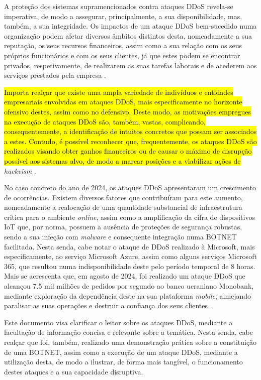 A proteção dos sistemas supramencionados contra ataques DDoS revela-se imperativa, de modo a assegurar, principalmente, a sua disponibilidade, mas, também, a sua integridade. Os impactos de um ataque DDoS bem-sucedido numa organização podem afetar diversos âmbitos distintos desta, nomeadamente a sua reputação, os seus recursos financeiros, assim como a sua relação com os seus próprios funcionários e com os seus clientes, já que estes podem se encontrar privados, respetivamente, de realizarem as suas tarefas laborais e de acederem aos serviços prestados pela empresa \cite{kaspersky_how_ddos_works}.


\hl{Importa realçar que existe uma ampla variedade de indivíduos e entidades empresariais envolvidas em ataques DDoS, mais especificamente no horizonte ofensivo destes, assim como no defensivo. Deste modo, as motivações empregues na execução de ataques DDoS são, também, vastas, complicando, consequentemente, a identificação de intuitos concretos que possam ser associados a estes. Contudo, é possível reconhecer que, frequentemente, os ataques DDoS são realizados visando obter ganhos financeiros ou de causar o máximo de disrupção possível aos sistemas alvo, de modo a marcar posições e a viabilizar ações de} \textit{hackvism} \cite{fortinet_what_is_ddos}.

No caso concreto do ano de 2024, os ataques DDoS apresentaram um crescimento de ocorrências. Existem diversos fatores que contribuíram para este aumento, nomeadamente a realocação de uma quantidade substancial de infraestrutura critica para o ambiente \textit{online}, assim como a amplificação da cifra de dispositivos IoT que, por norma, possuem a ausência de proteções de segurança robustas, sendo a sua infeção com \textit{malware} e consequente integração numa BOTNET facilitada. Nesta senda, cabe notar o ataque de DDoS realizado à Microsoft, mais especificamente, ao serviço Microsoft Azure, assim como alguns serviços Microsoft 365, que resultou numa indisponibilidade deste pelo período temporal de 8 horas. Mais se acrescenta que, em agosto de 2024, foi realizado um ataque DDoS que alcançou 7.5 mil milhões de pedidos por segundo ao banco ucraniano Monobank, mediante exploração da dependência deste na sua plataforma \textit{mobile}, almejando paralisar as suas operações e destruir a confiança dos seus clientes \cite{redhelix_rise_ddos_attacks}.

Este documento visa clarificar o leitor sobre os ataques DDoS, mediante a facultação de informação concisa e relevante sobre a temática. Nesta senda, cabe realçar que foi, também, realizado uma demonstração prática sobre a constituição de uma BOTNET, assim como a execução de um ataque DDoS, mediante a utilização desta, de modo a ilustrar, de forma mais tangível, o funcionamento destes ataques e a sua capacidade disruptiva.


